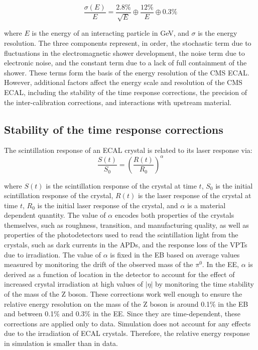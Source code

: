 \begin{equation}
    \frac{\sigma(E)}{E} = \frac{2.8\%}{\sqrt{E}} \oplus \frac{12\%}{E} \oplus 0.3\%
\end{equation}

\noindent where $E$ is the energy of an interacting particle in GeV, and $\sigma$ is the energy resolution. The three components represent, in order, the stochastic term due to fluctuations in the electromagnetic shower development, the noise term due to electronic noise, and the constant term due to a lack of full containment of the shower. These terms form the basis of the energy resolution of the CMS ECAL. However, additional factors affect the energy scale and resolution of the CMS ECAL, including the stability of the time response corrections, the precision of the inter-calibration corrections, and interactions with upstream material.

\subsection{Stability of the time response corrections}

The scintillation response of an ECAL crystal is related to its laser response via:
\begin{equation}
    \frac{S(t)}{S_0} = \left( \frac{R(t)}{R_0}\right)^{\alpha}
\end{equation}

\noindent where $S(t)$ is the scintillation response of the crystal at time $t$, $S_0$ is the initial scintillation response of the crystal, $R(t)$ is the laser response of the crystal at time $t$, $R_0$ is the initial laser response of the crystal, and $\alpha$ is a material dependent quantity. The value of $\alpha$ encodes both properties of the crystals themselves, such as roughness, transition, and manufacturing quality, as well as properties of the photodetectors used to read the scintillation light from the crystals, such as dark currents in the APDs, and the response loss of the VPTs due to irradiation. The value of $\alpha$ is fixed in the EB based on average values measured by monitoring the drift of the observed mass of the $\pi^0$. In the EE, $\alpha$ is derived as a function of location in the detector to account for the effect of increased crystal irradiation at high values of $|\eta|$ by monitoring the time stability of the mass of the Z boson. These corrections work well enough to ensure the relative energy resolution on the mass of the Z boson is around 0.1\% in the EB and between 0.1\% and 0.3\% in the EE. Since they are time-dependent, these corrections are applied only to data. Simulation does not account for any effects due to the irradiation of ECAL crystals. Therefore, the relative energy response in simulation is smaller than in data.

